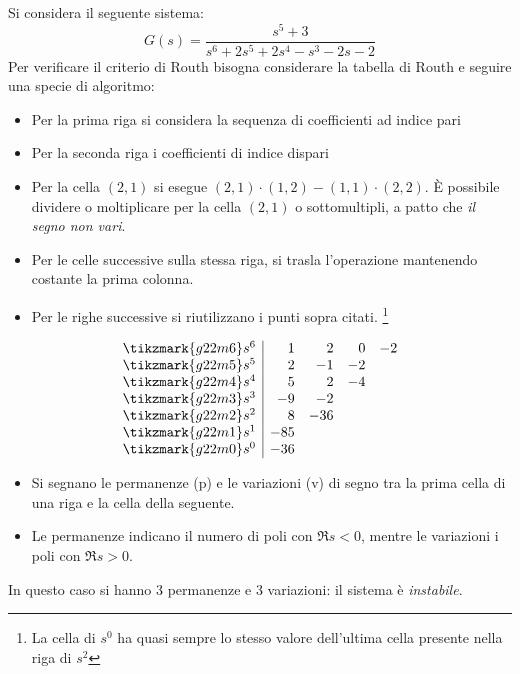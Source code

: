 \begin{esempio}
Si considera il seguente sistema:
\[
	G(s) = \frac{s^5 + 3}{s^6 + 2s^5 + 2s^4 - s^3 - 2s - 2}
\]
Per verificare il criterio di Routh bisogna considerare la tabella di Routh e
seguire una specie di algoritmo:
\begin{itemize}
	\item Per la prima riga si considera la sequenza di coefficienti ad indice pari
	\item Per la seconda riga i coefficienti di indice dispari
	\item Per la cella \((2,1)\) si esegue \((2,1)\cdot(1,2) - (1,1)\cdot(2,2)\).
		È possibile dividere o moltiplicare per la cella \((2,1)\) o
		sottomultipli, a patto che \emph{il segno non vari}.
	\item Per le celle successive sulla stessa riga, si trasla l'operazione
		mantenendo costante la prima colonna.
	\item Per le righe successive si riutilizzano i punti sopra citati.%
		\footnote{La cella di \(s^0\) ha quasi sempre lo stesso valore
			dell'ultima cella presente nella riga di \(s^2\)}
\end{itemize}
\[\begin{array}{r|rrrr}
	\tikzmark{g22m6}s^6 &   1 &   2 &  0 & -2	\\
	\tikzmark{g22m5}s^5 &   2 & - 1 & -2 	\\
	\tikzmark{g22m4}s^4 &   5 &   2 & -4 	\\
	\tikzmark{g22m3}s^3 & - 9 & - 2		\\
	\tikzmark{g22m2}s^2 &   8 & -36		\\
	\tikzmark{g22m1}s^1 & -85			\\
	\tikzmark{g22m0}s^0 & -36
\end{array}\]
\begin{itemize}
	\item Si segnano le permanenze (p) e le variazioni (v) di segno tra la prima cella
		di una riga e la cella della seguente.
	\item Le permanenze indicano il numero di poli con \(\Re s < 0\), mentre
		le variazioni i poli con \(\Re s > 0\).
\end{itemize}
In questo caso si hanno 3 permanenze e 3 variazioni: il sistema è \emph{instabile}.
\end{esempio}

